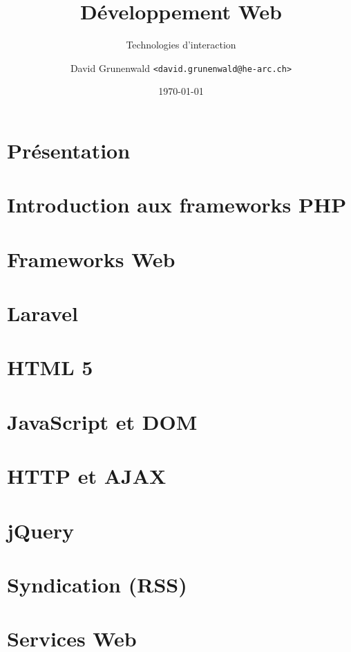 \documentclass[a4paper,12pt]{scrbook}
\title{Développement Web}
\subtitle{Technologies d'interaction}
\author{%
    David Grunenwald \texttt{<david.grunenwald@he-arc.ch>}}
\date{\today}
\begin{document}
\maketitle

\tableofcontents

\chapter{ Présentation}


\chapter{ Introduction aux frameworks PHP}


\chapter{ Frameworks Web}


\chapter{ Laravel}


\chapter{ HTML 5}


\chapter{ JavaScript et DOM}


\chapter{ HTTP et AJAX}


\chapter{ jQuery}


\chapter{ Syndication (RSS)}


\chapter{ Services Web}

\end{document}
